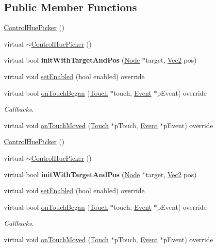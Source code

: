 \subsection*{Public Member Functions}
\begin{DoxyCompactItemize}
\item 
\hyperlink{classControlHuePicker_ae7c74962cc16be8a2a0ccc358f794338}{Control\+Hue\+Picker} ()
\item 
virtual \hyperlink{classControlHuePicker_a7801e3953c138c926ae9e0544928232e}{$\sim$\+Control\+Hue\+Picker} ()
\item 
\mbox{\label{classControlHuePicker_a284c74a4c9035683f4862e3341596b07}} 
virtual bool {\bfseries init\+With\+Target\+And\+Pos} (\hyperlink{classNode}{Node} $\ast$target, \hyperlink{classVec2}{Vec2} pos)
\item 
virtual void \hyperlink{classControlHuePicker_a45c6330610f27124057f4d69b37abc9b}{set\+Enabled} (bool enabled) override
\item 
virtual bool \hyperlink{classControlHuePicker_ae14f5994e10b93bec6b4de027902b2a1}{on\+Touch\+Began} (\hyperlink{classTouch}{Touch} $\ast$touch, \hyperlink{classEvent}{Event} $\ast$p\+Event) override
\begin{DoxyCompactList}\small\item\em Callbacks. \end{DoxyCompactList}\item 
virtual void \hyperlink{classControlHuePicker_a09874584a6a21355d830546ee3b0751d}{on\+Touch\+Moved} (\hyperlink{classTouch}{Touch} $\ast$p\+Touch, \hyperlink{classEvent}{Event} $\ast$p\+Event) override
\item 
\hyperlink{classControlHuePicker_a2c7dd18880705f8132e0e1e5c73154ba}{Control\+Hue\+Picker} ()
\item 
virtual \hyperlink{classControlHuePicker_ac78165c25c1618abef6eaad137f53376}{$\sim$\+Control\+Hue\+Picker} ()
\item 
\mbox{\label{classControlHuePicker_a7ec14291a1027ca7dbff5514d3796535}} 
virtual bool {\bfseries init\+With\+Target\+And\+Pos} (\hyperlink{classNode}{Node} $\ast$target, \hyperlink{classVec2}{Vec2} pos)
\item 
virtual void \hyperlink{classControlHuePicker_a2e6169e815f3ee9fa83f00f9e20f7292}{set\+Enabled} (bool enabled) override
\item 
virtual bool \hyperlink{classControlHuePicker_af178753e94f91d15e613bf0c6387af5b}{on\+Touch\+Began} (\hyperlink{classTouch}{Touch} $\ast$touch, \hyperlink{classEvent}{Event} $\ast$p\+Event) override
\begin{DoxyCompactList}\small\item\em Callbacks. \end{DoxyCompactList}\item 
virtual void \hyperlink{classControlHuePicker_ae287e5f1cd8856c76475825549f098d8}{on\+Touch\+Moved} (\hyperlink{classTouch}{Touch} $\ast$p\+Touch, \hyperlink{classEvent}{Event} $\ast$p\+Event) override
\end{DoxyCompactItemize}
